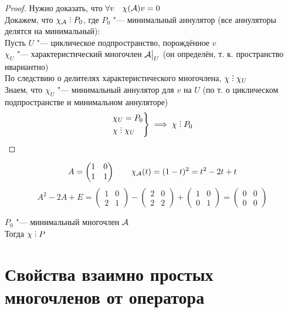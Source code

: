 \begin{proof}
	Нужно доказать, что $ \forall v \quad \chi(\mathcal{A})v = 0 $ \\
	Докажем, что $ \chi_{\mc{A}} \divby P_0 $, где $ P_0 $ "--- минимальный аннулятор (все аннуляторы делятся на минимальный): \\
	Пусть $ U $ "--- циклическое подпространство, порождённое $ v $ \\
	$ \chi_U $ "--- характеристический многочлен $ \mathcal{A}\big|_{U}^{} $ (он определён, т. к. пространство ивариантно) \\
	По следствию о делителях характеристического многочлена, $ \chi \divby \chi_U $ \\
	Знаем, что $ \chi_U $ "--- минимальный аннулятор для $ v $ на $ U $ (по т. о циклическом подпространстве и минимальном аннуляторе)
	$$
	\begin{rcases}
		\chi_U = P_0 \\
		\chi \divby \chi_U
	\end{rcases} \implies \chi \divby P_0 $$
\end{proof}

\begin{eg}
	$$ A =
	\begin{pmatrix}
		1 & 0 \\
		1 & 1
	\end{pmatrix} \qquad \chi_{\mathcal{A}}(t) = (1 - t)^2 = t^2 - 2t + t $$
	$$ A^2 - 2A + E =
	\begin{pmatrix}
		1 & 0 \\
		2 & 1
	\end{pmatrix} -
	\begin{pmatrix}
		2 & 0 \\
		2 & 2
	\end{pmatrix} +
	\begin{pmatrix}
		1 & 0 \\
		0 & 1
	\end{pmatrix} =
	\begin{pmatrix}
		0 & 0 \\
		0 & 0
	\end{pmatrix} $$
\end{eg}

\begin{implication}
	$ P_0 $ "--- минимальный многочлен $ \mathcal{A} $ \\
	Тогда $ \chi \divby P $
\end{implication}

\section{Свойства взаимно простых многочленов от оператора}


